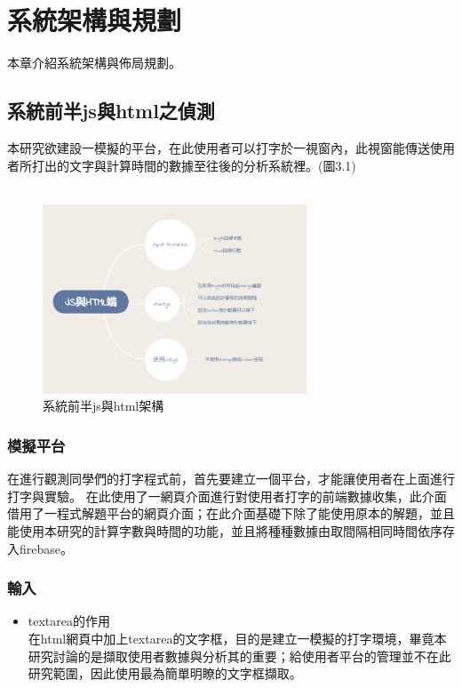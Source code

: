 \chapter{系統架構與規劃}

\lstset{style=mystyle}
本章介紹系統架構與佈局規劃。

\section{系統前半js與html之偵測} 
本研究欲建設一模擬的平台，在此使用者可以打字於一視窗內，此視窗能傳送使用者所打出的文字與計算時間的數據至往後的分析系統裡。(圖3.1)\\\\
\begin{figure}[H] %
		\centering %
		\includegraphics[width=0.7\textwidth]{1.png} %
		\caption{系統前半js與html架構} %
		\label{Fig.3.1} %
\end{figure}
\subsection{模擬平台}
在進行觀測同學們的打字程式前，首先要建立一個平台，才能讓使用者在上面進行打字與實驗。
在此使用了一網頁介面進行對使用者打字的前端數據收集，此介面借用了一程式解題平台的網頁介面；在此介面基礎下除了能使用原本的解題，並且能使用本研究的計算字數與時間的功能，並且將種種數據由取間隔相同時間依序存入firebase。
\subsection{輸入}	
\begin{itemize}
	\item textarea的作用\\
	在html網頁中加上textarea的文字框，目的是建立一模擬的打字環境，畢竟本研究討論的是擷取使用者數據與分析其的重要；給使用者平台的管理並不在此研究範圍，因此使用最為簡單明瞭的文字框擷取。
\end{itemize}

